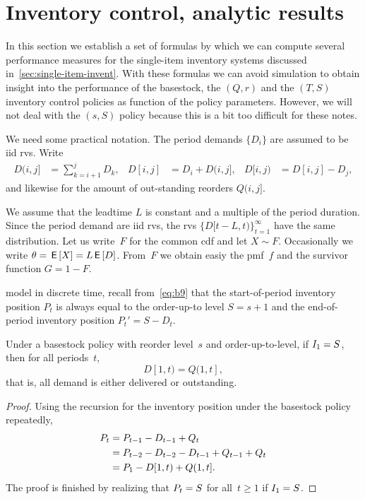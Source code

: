 \documentclass[queueing-book.tex]{subfiles}
\begin{document}
\section{Inventory control, analytic results}

In this section we establish a set of formulas by which we can compute several performance measures for the single-item inventory systems discussed in~\cref{sec:single-item-invent}.
With these formulas we can avoid simulation to obtain insight into the performance of the basestock, the $(Q,r)$ and the $(T,S)$ inventory control policies as function of the policy parameters. However,
we will not deal with the $(s,S)$ policy because this is a bit too difficult for these notes.

We need some practical notation.
The period demands $\{D_{i}\}$ are assumed to be iid rvs.
Write
\begin{align*}
  D(i, j] &= \sum_{k=i+1}^{j} D_k, &   D[i, j] &= D_{i} + D(i, j],  &   D[i, j) &= D[i, j] - D_{j},
\end{align*}
and likewise for the amount of out-standing reorders $Q(i, j]$.


We assume that the leadtime $L$ is constant and a multiple of the period duration.
Since the period demand are iid rvs, the rvs $\{D[t-L, t)\}_{t=1}^{\infty}$ have the same distribution.
Let us write~$F$ for the common cdf and let $X\sim F$.
Occasionally we write $\theta = \,\mathsf{E}\left[X\right] = L \,\mathsf{E}\left[D\right]$.
From~$F$ we obtain easiy the pmf~$f$ and the survivor function $G=1-F$.


 model in discrete time, recall from~\cref{eq:b9} that the start-of-period inventory position $P_{t}$ is always equal to the order-up-to level $S=s+1$ and the end-of-period inventory position $P_t' = S - D_{t}$.


\begin{lemma}\label{lem:1}
Under a basestock policy with reorder level~$s$ and order-up-to-level, if $I_{1} = S$, then for all periods~$t$,
\begin{equation*}
    D[1, t) = Q(1, t],
\end{equation*}
that is, all demand is either delivered or outstanding.
\end{lemma}
\begin{proof}
Using the recursion for the inventory position under the basestock policy repeatedly,
\begin{align*}
    P_t
&= P_{t-1} -D_{t-1}+ Q_t  \\
&= P_{t-2} -D_{t-2} - D_{t-1}+  Q_{t-1}+ Q_t  \\
&= P_1 - D[1, t) +     Q(1, t].
\end{align*}
The proof is finished by realizing that $P_{t} = S$ for all~$t\geq 1$ if $I_1=S$.
\end{proof}
\end{document}
